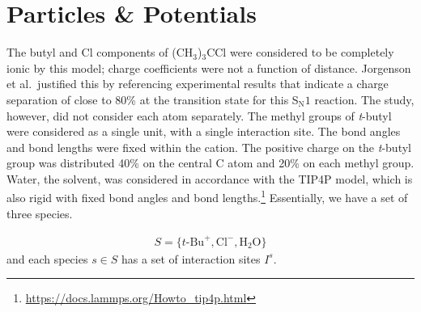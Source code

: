 \documentclass[12pt]{article}
\begin{document}
\section{Particles \& Potentials}
The butyl and Cl components of (CH$_{3}$)$_{3}$CCl were considered to be completely ionic by this model; charge coefficients were not a function of distance. Jorgenson et al.\ justified this by referencing experimental results that indicate a charge separation of close to 80\% at the transition state for this S$_{\text{N}}1$ reaction. The study, however, did not consider each atom separately. The methyl groups of \textit{t}-butyl were considered as a single unit, with a single interaction site. The bond angles and bond lengths were fixed within the \tbutyl cation. The positive charge on the \textit{t}-butyl group was distributed 40\% on the central C atom and 20\% on each methyl group. Water, the solvent, was considered in accordance with the TIP4P model, which is also rigid with fixed bond angles and bond lengths.\footnote{\url{https://docs.lammps.org/Howto_tip4p.html}} Essentially, we have a set of three species.


\begin{gather*}
    S = \{\textit{t-}\text{Bu}^{+}, \text{Cl}^{-}, \text{H$_{2}$O}\}
\end{gather*}
and each species $s \in S$ has a set of interaction sites $I^{s}$.
\end{document}
